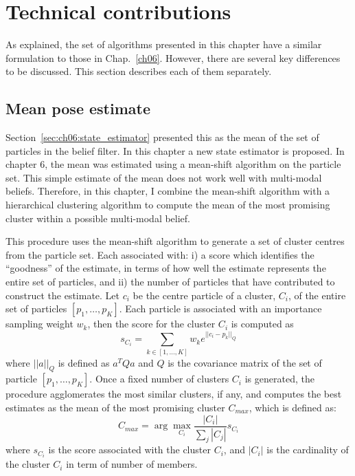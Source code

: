 \section{Technical contributions}\label{sec:ch07:problem_domain}

As explained, the set of algorithms presented in this chapter have a similar formulation to those in Chap.~\ref{ch06}. 
However, there are several key differences to be discussed. This section describes each of them separately.

\subsection{Mean pose estimate}\label{sec:ch07:state_estimator}

Section~\ref{sec:ch06:state_estimator} presented this as the mean of the set of particles in the belief filter. In this chapter a new state estimator is proposed. In chapter 6, the mean was estimated using a mean-shift algorithm on the particle set. This simple estimate of the mean does not work well with multi-modal beliefs. Therefore, in this chapter, I combine the mean-shift algorithm with a hierarchical clustering algorithm to compute the mean of the most promising cluster within a possible multi-modal belief.

This procedure uses the mean-shift algorithm to generate a set of cluster centres from the particle set. Each associated with: i) a score which identifies the ``goodness'' of the estimate, in terms of how well the estimate represents the entire set of particles, and ii) the number of particles that have contributed to construct the estimate. 
Let $c_i$ be the centre particle of a cluster, $C_i$, of the entire set of particles $[p_1,\dots,p_K]$. Each particle is associated with an importance sampling weight $w_k$, then the score for the cluster $C_i$ is computed as
$$
s_{C_i} = \sum_{k\in[1,\dots,K]}{w_ke^{||c_i-p_k||_Q}}
$$
where $||a||_Q$ is defined as $a^TQa$ and $Q$ is the covariance matrix of the set of particle $[p_1,\dots,p_K]$. Once a fixed number of clusters $C_i$ is generated, the procedure agglomerates the most similar clusters, if any, and computes the best estimates as the mean of the most promising cluster $C_{max}$, which is defined as:
$$
C_{max} = \arg\max_{C_i}{\frac{|C_i|}{\sum_j{|C_j|}}s_{C_i}}
$$  
where $s_{C_i}$ is the score associated with the cluster $C_i$, and $|C_i|$ is the cardinality of the cluster $C_i$ in term of number of members.

